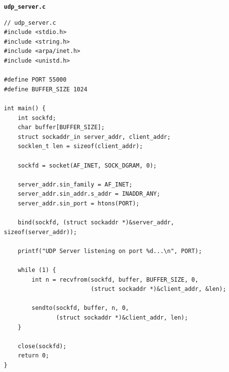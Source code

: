 \documentclass[a4paper,12pt]{article}
\begin{document}
\noindent
\textbf{\texttt{udp\_server.c}}
\begin{lstlisting}
// udp_server.c
#include <stdio.h>
#include <string.h>
#include <arpa/inet.h>
#include <unistd.h>

#define PORT 55000
#define BUFFER_SIZE 1024

int main() {
    int sockfd;
    char buffer[BUFFER_SIZE];
    struct sockaddr_in server_addr, client_addr;
    socklen_t len = sizeof(client_addr);

    sockfd = socket(AF_INET, SOCK_DGRAM, 0);

    server_addr.sin_family = AF_INET;
    server_addr.sin_addr.s_addr = INADDR_ANY;
    server_addr.sin_port = htons(PORT);

    bind(sockfd, (struct sockaddr *)&server_addr, sizeof(server_addr));

    printf("UDP Server listening on port %d...\n", PORT);

    while (1) {
        int n = recvfrom(sockfd, buffer, BUFFER_SIZE, 0,
                         (struct sockaddr *)&client_addr, &len);

        sendto(sockfd, buffer, n, 0,
               (struct sockaddr *)&client_addr, len);
    }

    close(sockfd);
    return 0;
}
\end{lstlisting}
\end{document}
